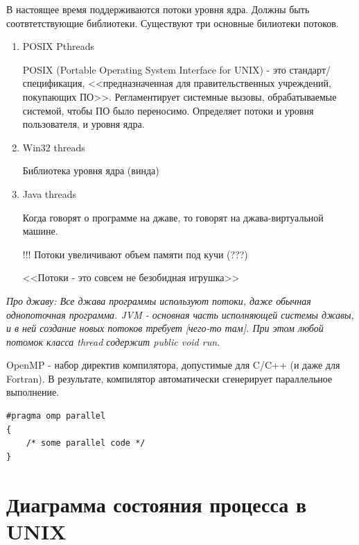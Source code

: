 \documentclass[14pt, a4paper]{article}
\begin{document}
	В настоящее время поддерживаются потоки уровня ядра. Должны быть соотвтетствующие библиотеки. Существуют три основные билиотеки потоков.
	
	\begin{enumerate}
		\item POSIX Pthreads
		
		POSIX (Portable Operating System Interface for UNIX) - это стандарт/спецификация, <<предназначенная для правительственных учреждений, покупающих ПО>>. Регламентирует системные вызовы, обрабатываемые системой, чтобы ПО было переносимо. Определяет потоки и уровня пользователя, и уровня ядра.
		
		\item Win32 threads
		
		Библиотека уровня ядра (винда)
		
		\item Java threads
		
		Когда говорят о программе на джаве, то говорят на джава-виртуальной машине.
		
		!!! Потоки увеличивают объем памяти под кучи (???)
		
		<<Потоки - это совсем не безобидная игрушка>>
	\end{enumerate}

	{\it Про джаву: Все джава программы используют потоки, даже обычная однопоточная программа. JVM - основная часть исполняющей системы джавы, и в ней создание новых потоков требует [чего-то там]. При этом любой потомок класса thread содержит public void run.}
	
	OpenMP - набор директив компилятора, допустимые для C/C++ (и даже для Fortran). В результате, компилятор автоматически сгенерирует параллельное выполнение.

	\begin{lstlisting}
#pragma omp parallel
{
	/* some parallel code */
}
	\end{lstlisting}

	\section*{Диаграмма состояния процесса в UNIX}
	
\end{document}
